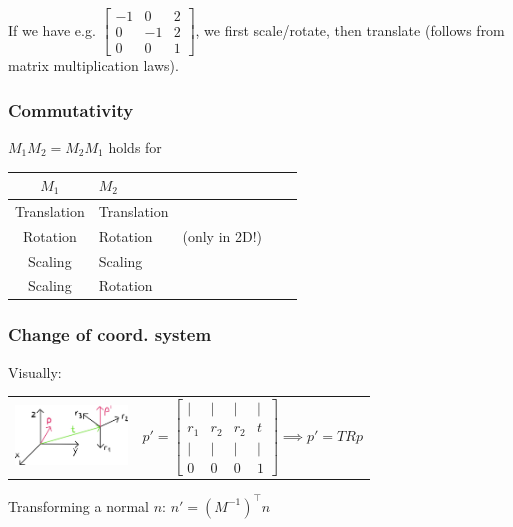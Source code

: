 \documentclass[a4paper,10pt]{article}
\renewcommand*{\arraystretch}{2}
\begin{document}
\egroup
If we have e.g. \(  \left[\begin{smallmatrix} -1 & 0 & 2 \\ 0 & -1 & 2 \\ 0 & 0 & 1 \end{smallmatrix}\right] \), we first scale/rotate, then translate (follows from matrix multiplication laws).

\subsubsection{Commutativity}
\( M_1 M_{2} = M_{2} M_{1} \) holds for
\begin{center}
    {\renewcommand{\arraystretch}{1.2}
    \begin{tabularx}{\linewidth}{c>{\centering\arraybackslash}Xc>{\centering\arraybackslash}Xc}
	\toprule
	\( M_{1} \) & \( M_{2} \) & \\
	\midrule
	Translation & Translation & \\
	Rotation & Rotation & (only in 2D!) \\
	Scaling & Scaling &\\
	Scaling & Rotation & \\
	\bottomrule
    \end{tabularx}
    }
\end{center}

\subsubsection{Change of coord. system} Visually:

\begin{tabular}{m{3cm}r}
    \includegraphics[width=3cm]{coord-system-change.jpeg}
&
$
 p' = \left[\begin{smallmatrix} | & | & | & | \\ r_1 & r_2 & r_2 & t \\ | & | & | & | \\ 0 & 0 & 0 & 1 \end{smallmatrix}\right] \implies p' = TRp
$
\\
\end{tabular}

Transforming a normal \( n \): \( n' = (M^{-1})^\top n \)
\end{document}
